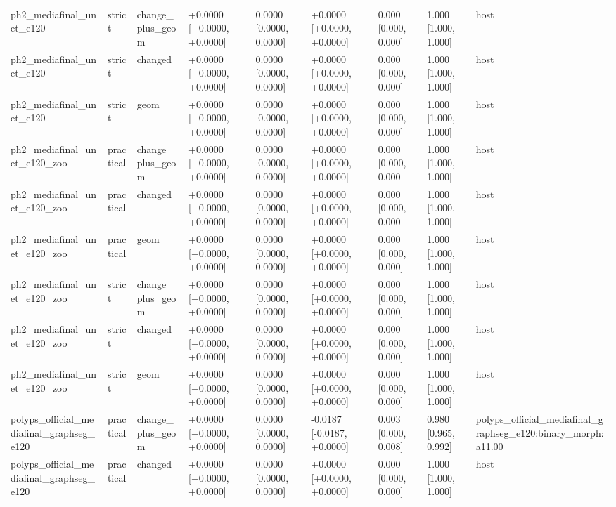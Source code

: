\begin{table}[t]
\begin{tabular}{lllllllll}
ph2\_mediafinal\_unet\_e120 & strict & change\_plus\_geom & +0.0000 [+0.0000, +0.0000] & 0.0000 [0.0000, 0.0000] & +0.0000 [+0.0000, +0.0000] & 0.000 [0.000, 0.000] & 1.000 [1.000, 1.000] & host \\
ph2\_mediafinal\_unet\_e120 & strict & changed & +0.0000 [+0.0000, +0.0000] & 0.0000 [0.0000, 0.0000] & +0.0000 [+0.0000, +0.0000] & 0.000 [0.000, 0.000] & 1.000 [1.000, 1.000] & host \\
ph2\_mediafinal\_unet\_e120 & strict & geom & +0.0000 [+0.0000, +0.0000] & 0.0000 [0.0000, 0.0000] & +0.0000 [+0.0000, +0.0000] & 0.000 [0.000, 0.000] & 1.000 [1.000, 1.000] & host \\
ph2\_mediafinal\_unet\_e120\_zoo & practical & change\_plus\_geom & +0.0000 [+0.0000, +0.0000] & 0.0000 [0.0000, 0.0000] & +0.0000 [+0.0000, +0.0000] & 0.000 [0.000, 0.000] & 1.000 [1.000, 1.000] & host \\
ph2\_mediafinal\_unet\_e120\_zoo & practical & changed & +0.0000 [+0.0000, +0.0000] & 0.0000 [0.0000, 0.0000] & +0.0000 [+0.0000, +0.0000] & 0.000 [0.000, 0.000] & 1.000 [1.000, 1.000] & host \\
ph2\_mediafinal\_unet\_e120\_zoo & practical & geom & +0.0000 [+0.0000, +0.0000] & 0.0000 [0.0000, 0.0000] & +0.0000 [+0.0000, +0.0000] & 0.000 [0.000, 0.000] & 1.000 [1.000, 1.000] & host \\
ph2\_mediafinal\_unet\_e120\_zoo & strict & change\_plus\_geom & +0.0000 [+0.0000, +0.0000] & 0.0000 [0.0000, 0.0000] & +0.0000 [+0.0000, +0.0000] & 0.000 [0.000, 0.000] & 1.000 [1.000, 1.000] & host \\
ph2\_mediafinal\_unet\_e120\_zoo & strict & changed & +0.0000 [+0.0000, +0.0000] & 0.0000 [0.0000, 0.0000] & +0.0000 [+0.0000, +0.0000] & 0.000 [0.000, 0.000] & 1.000 [1.000, 1.000] & host \\
ph2\_mediafinal\_unet\_e120\_zoo & strict & geom & +0.0000 [+0.0000, +0.0000] & 0.0000 [0.0000, 0.0000] & +0.0000 [+0.0000, +0.0000] & 0.000 [0.000, 0.000] & 1.000 [1.000, 1.000] & host \\
polyps\_official\_mediafinal\_graphseg\_e120 & practical & change\_plus\_geom & +0.0000 [+0.0000, +0.0000] & 0.0000 [0.0000, 0.0000] & -0.0187 [-0.0187, +0.0000] & 0.003 [0.000, 0.008] & 0.980 [0.965, 0.992] & polyps\_official\_mediafinal\_graphseg\_e120:binary\_morph:a11.00 \\
polyps\_official\_mediafinal\_graphseg\_e120 & practical & changed & +0.0000 [+0.0000, +0.0000] & 0.0000 [0.0000, 0.0000] & +0.0000 [+0.0000, +0.0000] & 0.000 [0.000, 0.000] & 1.000 [1.000, 1.000] & host \\

\end{tabular}
\end{table}
